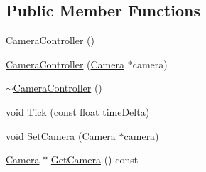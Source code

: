 \subsection*{Public Member Functions}
\begin{DoxyCompactItemize}
\item 
\mbox{\hyperlink{classec_1_1_camera_controller_a53fd061c49374fd8f1194cecac1e35aa}{Camera\+Controller}} ()
\item 
\mbox{\hyperlink{classec_1_1_camera_controller_a9edd8fff13533c84c7ea8f7f10f16580}{Camera\+Controller}} (\mbox{\hyperlink{classec_1_1_camera}{Camera}} $\ast$camera)
\item 
\mbox{\hyperlink{classec_1_1_camera_controller_a3229bd664f0d7d00b90fc3c9a852768c}{$\sim$\+Camera\+Controller}} ()
\item 
void \mbox{\hyperlink{classec_1_1_camera_controller_a0f9378014e5501eec0af79fd7006a4d7}{Tick}} (const float time\+Delta)
\item 
void \mbox{\hyperlink{classec_1_1_camera_controller_a3cbf6829af7035fa648ef9283f1f6b34}{Set\+Camera}} (\mbox{\hyperlink{classec_1_1_camera}{Camera}} $\ast$camera)
\item 
\mbox{\hyperlink{classec_1_1_camera}{Camera}} $\ast$ \mbox{\hyperlink{classec_1_1_camera_controller_a25865e00f787b3e086167e455cbfc3d7}{Get\+Camera}} () const
\end{DoxyCompactItemize}
